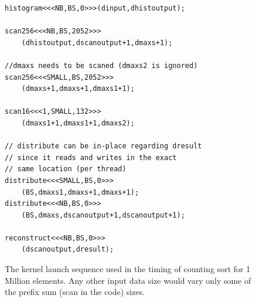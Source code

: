 \begin{figure} 
\begin{small}
\begin{verbatim} 
histogram<<<NB,BS,0>>>(dinput,dhistoutput);
  
scan256<<<NB,BS,2052>>>
    (dhistoutput,dscanoutput+1,dmaxs+1);
  
//dmaxs needs to be scaned (dmaxs2 is ignored) 
scan256<<<SMALL,BS,2052>>>
    (dmaxs+1,dmaxs+1,dmaxs1+1); 

scan16<<<1,SMALL,132>>>
    (dmaxs1+1,dmaxs1+1,dmaxs2); 

// distribute can be in-place regarding dresult 
// since it reads and writes in the exact 
// same location (per thread)
distribute<<<SMALL,BS,0>>>
    (BS,dmaxs1,dmaxs+1,dmaxs+1);
distribute<<<NB,BS,0>>>
    (BS,dmaxs,dscanoutput+1,dscanoutput+1);

reconstruct<<<NB,BS,0>>>
    (dscanoutput,dresult);   
\end{verbatim}
\end{small}
\caption{The kernel launch sequence used in the timing of counting sort for 
1 Million elements. Any other input data size would vary only some of the prefix 
sum (scan in the code) sizes.}
\label{fig:csortframe}
\end{figure}








 
